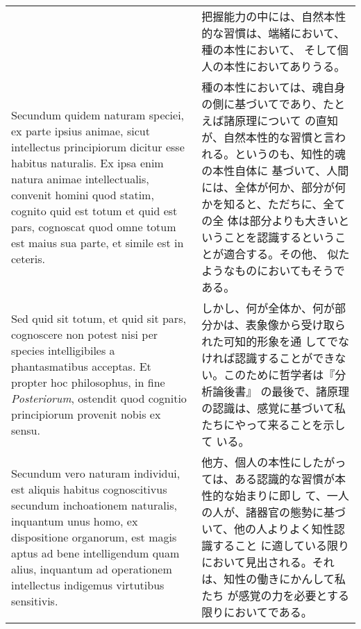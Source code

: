 \documentclass[10pt]{jsarticle} %
\begin{document}
\begin{longtable}{p{21em}p{21em}}
&

把握能力の中には、自然本性的な習慣は、端緒において、種の本性において、
そして個人の本性においてありうる。

\\


Secundum quidem naturam speciei, ex parte ipsius animae, sicut
intellectus principiorum dicitur esse habitus naturalis. Ex ipsa enim
natura animae intellectualis, convenit homini quod statim, cognito
quid est totum et quid est pars, cognoscat quod omne totum est maius
sua parte, et simile est in ceteris.

&

種の本性においては、魂自身の側に基づいてであり、たとえば諸原理について
の直知が、自然本性的な習慣と言われる。というのも、知性的魂の本性自体に
基づいて、人間には、全体が何か、部分が何かを知ると、ただちに、全ての全
体は部分よりも大きいということを認識するということが適合する。その他、
似たようなものにおいてもそうである。


\\



Sed quid sit totum, et quid sit pars, cognoscere non potest nisi per
species intelligibiles a phantasmatibus acceptas. Et propter hoc
philosophus, in fine {\itshape Posteriorum}, ostendit quod cognitio
principiorum provenit nobis ex sensu.

&

しかし、何が全体か、何が部分かは、表象像から受け取られた可知的形象を通
してでなければ認識することができない。このために哲学者は『分析論後書』
の最後で、諸原理の認識は、感覚に基づいて私たちにやって来ることを示して
いる。

\\



Secundum vero naturam individui, est aliquis habitus cognoscitivus
secundum inchoationem naturalis, inquantum unus homo, ex dispositione
organorum, est magis aptus ad bene intelligendum quam alius, inquantum
ad operationem intellectus indigemus virtutibus sensitivis.

&

他方、個人の本性にしたがっては、ある認識的な習慣が本性的な始まりに即し
て、一人の人が、諸器官の態勢に基づいて、他の人よりよく知性認識すること
に適している限りにおいて見出される。それは、知性の働きにかんして私たち
が感覚の力を必要とする限りにおいてである。

\\




\end{longtable}
\end{document}
